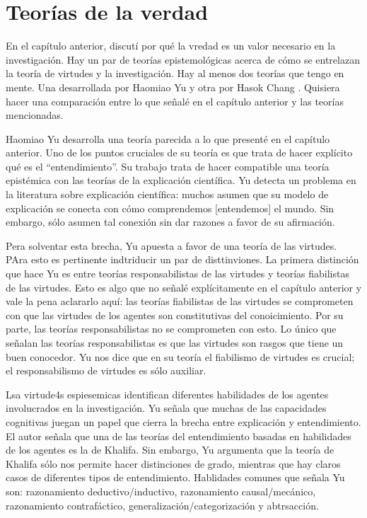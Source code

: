 \chapter{Teorías de la verdad}

En el capítulo anterior, discutí por qué la vredad es un valor necesario en la investigación. Hay un par de teorías epistemológicas acerca de cómo se entrelazan la teoría de virtudes y la investigación. Hay al menos dos teorías que tengo en mente. Una desarrollada por Haomiao Yu \citeyear{Yu2021}y otra por Hasok Chang \citeyear{Chang2017-CHAIPC-3}. Quisiera hacer una comparación entre lo que señalé en el capítulo anterior y las teorías mencionadas.

Haomiao Yu desarrolla una teoría parecida a lo que presenté en el capítulo anterior. Uno de los puntos cruciales de su teoría es que trata de hacer explícito qué es el ``entendimiento''. Su trabajo trata de hacer compatible una teoría epistémica con las teorías de la explicación científica. Yu detecta un problema en la literatura sobre explicación científica: muchos asumen que su modelo de explicación se conecta con cómo comprendemos [entendemos] el mundo. Sin embargo, sólo asumen tal conexión sin dar razones a favor de su afirmación.

Pera solventar esta brecha, Yu apuesta a favor de una teoría de las virtudes. PAra esto es pertinente indtriducir un par de disttinviones. La primera distinción que hace Yu es entre teorías responsabilistas de las virtudes y teorías fiabilistas de las virtudes. Esto es algo que no señalé explícitamente en el capítulo anterior y vale la pena aclararlo aquí: las teorías fiabilistas de las virtudes se comprometen con que las virtudes de los agentes son constitutivas del conoicimiento. Por su parte, las teorías responsabilistas no se comprometen con esto. Lo único que señalan las teorías responsabilistas es que las virtudes son rasgos que tiene un buen conocedor. Yu nos dice que en su teoría el fiabilismo de virtudes es crucial; el responsabilismo de virtudes es sólo auxiliar.

Lsa virtude4s espiesemicas identifican diferentes habilidades de los agentes involucrados en la investigación. Yu señala que muchas de las capacidades cognitivas juegan un papel que cierra la brecha entre explicación y entendimiento. El autor señala que una de las teorías del entendimiento basadas en habilidades de los agentes es la de Khalifa. Sin embargo, Yu argumenta que la teoría de Khalifa sólo nos permite hacer distinciones de grado, mientras que hay claros casos de diferentes tipos de entendimiento. Hablidades comunes que señala Yu son: razonamiento deductivo/inductivo, razonamiento causal/mecánico, razonamiento contrafáctico, generalización/categorización y abtrsacción. 

